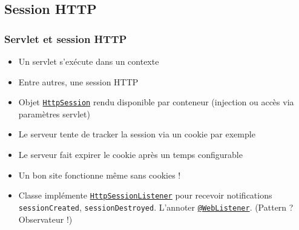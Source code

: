 \documentclass[english, french]{beamer}
\begin{document}
\subsection{Session HTTP}
\begin{frame}
	\frametitle{Servlet et session HTTP}
	\begin{itemize}
		\item Un servlet s’exécute dans un contexte
		\item Entre autres, une session HTTP
		\item Objet \href{http://docs.oracle.com/javaee/7/api/javax/servlet/http/HttpSession.html}{\texttt{HttpSession}} rendu disponible par conteneur ({\tiny injection ou } accès via paramètres servlet)
		\item Le serveur tente de tracker la session via un cookie {\tiny par exemple}
		\item Le serveur fait expirer le cookie après un temps configurable
		\item Un bon site fonctionne même sans cookies !
		\item Classe implémente \href{http://docs.oracle.com/javaee/7/api/javax/servlet/http/HttpSessionListener.html}{\texttt{HttpSessionListener}} pour recevoir notifications \texttt{sessionCreated}, \texttt{sessionDestroyed}.  L’annoter \href{http://docs.oracle.com/javaee/7/api/javax/servlet/annotation/WebListener.html}{\texttt{@WebListener}}. (Pattern ? \pause Observateur !)
	\end{itemize}
\end{frame}

\end{document}
